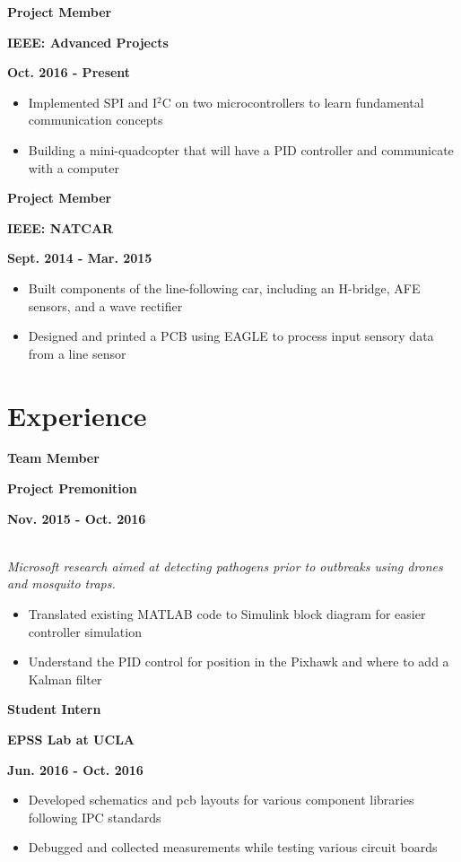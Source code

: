 \documentclass[12pt]{article}
\newcommand\textbox[1]{\parbox{.333\textwidth}{#1}}
\newcommand{\textlcr}[3]{\textbox{\textbf{#1}\hfill}\textbox{\hfil \textbf{#2}\hfil}\textbox{\hfill \textbf{#3}}}
\begin{document}
\bigskip
\textlcr{Project Member}{IEEE: Advanced Projects}{Oct. 2016 - Present}
\begin{itemize}
\item Implemented SPI and I$^2$C on two microcontrollers to learn fundamental communication concepts
\item Building a mini-quadcopter that will have a PID controller and communicate with a computer 
\end{itemize}

\bigskip
\textlcr{Project Member}{IEEE: NATCAR}{Sept. 2014 - Mar. 2015}
\begin{itemize}
\item Built components of the line-following car, including an H-bridge, AFE sensors, and a wave rectifier
\item Designed and printed a PCB using EAGLE to process input sensory data from a line sensor
\end{itemize}

\iffalse
\bigskip
\textlcr{Audio-Interface Clock}{Introduction to EE}{Jan. 2014 - Mar. 2014}
\begin{itemize}
\item Programmed using LabVIEW a finite-state machine for processing audio input
\item Implemented a circuit to detect audio cues, allowing interaction with the alarm clock
\end{itemize}
\fi

\section*{Experience}
\vspace*{-1em}\makebox[\linewidth]{\rule{\textwidth}{0.4pt}}

\textlcr{Team Member}{Project Premonition}{Nov. 2015 - Oct. 2016}
\\ \textit{Microsoft research aimed at detecting pathogens prior to outbreaks using drones and mosquito traps.}
\begin{itemize}
\item Translated existing MATLAB code to Simulink block diagram for easier controller simulation
\item Understand the PID control for position in the Pixhawk and where to add a Kalman filter
\end{itemize}

\bigskip
\textlcr{Student Intern}{EPSS Lab at UCLA}{Jun. 2016 - Oct. 2016}
\begin{itemize}
\item Developed schematics and pcb layouts for various component libraries following IPC standards
\item Debugged and collected measurements while testing various circuit boards
\end{itemize}
\end{document}
